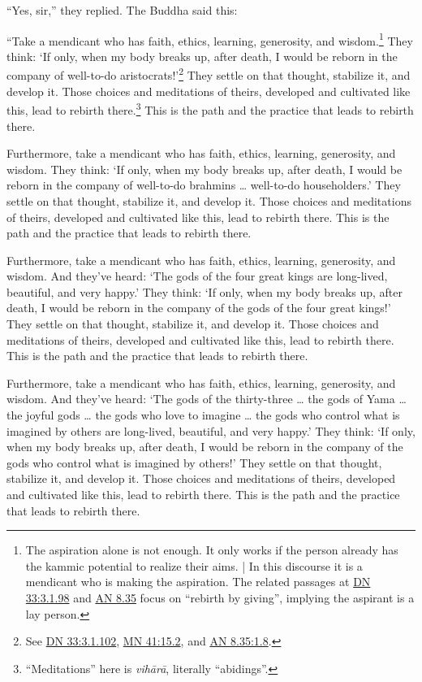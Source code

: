 \documentclass[12pt,openany]{book}%
\begin{document}
“Yes, sir,” they replied. The Buddha said this: 

“Take a mendicant who has faith, ethics, learning, generosity, and wisdom.\footnote{The aspiration alone is not enough. It only works if the person already has the kammic potential to realize their aims. | In this discourse it is a mendicant who is making the aspiration. The related passages at \href{https://suttacentral.net/dn33/en/sujato\#3.1.98}{DN 33:3.1.98} and \href{https://suttacentral.net/an8.35/en/sujato}{AN 8.35} focus on “rebirth by giving”, implying the aspirant is a lay person. } They think: ‘If only, when my body breaks up, after death, I would be reborn in the company of well-to-do aristocrats!’\footnote{See \href{https://suttacentral.net/dn33/en/sujato\#3.1.102}{DN 33:3.1.102}, \href{https://suttacentral.net/mn41/en/sujato\#15.2}{MN 41:15.2}, and \href{https://suttacentral.net/an8.35/en/sujato\#1.8}{AN 8.35:1.8}. } They settle on that thought, stabilize it, and develop it. Those choices and meditations of theirs, developed and cultivated like this, lead to rebirth there.\footnote{“Meditations” here is \textit{\textsanskrit{vihārā}}, literally “abidings”. } This is the path and the practice that leads to rebirth there. 

Furthermore, take a mendicant who has faith, ethics, learning, generosity, and wisdom. They think: ‘If only, when my body breaks up, after death, I would be reborn in the company of well-to-do brahmins … well-to-do householders.’ They settle on that thought, stabilize it, and develop it. Those choices and meditations of theirs, developed and cultivated like this, lead to rebirth there. This is the path and the practice that leads to rebirth there. 

Furthermore, take a mendicant who has faith, ethics, learning, generosity, and wisdom. And they’ve heard: ‘The gods of the four great kings are long-lived, beautiful, and very happy.’ They think: ‘If only, when my body breaks up, after death, I would be reborn in the company of the gods of the four great kings!’ They settle on that thought, stabilize it, and develop it. Those choices and meditations of theirs, developed and cultivated like this, lead to rebirth there. This is the path and the practice that leads to rebirth there. 

Furthermore, take a mendicant who has faith, ethics, learning, generosity, and wisdom. And they’ve heard: ‘The gods of the thirty-three … the gods of Yama … the joyful gods … the gods who love to imagine … the gods who control what is imagined by others are long-lived, beautiful, and very happy.’ They think: ‘If only, when my body breaks up, after death, I would be reborn in the company of the gods who control what is imagined by others!’ They settle on that thought, stabilize it, and develop it. Those choices and meditations of theirs, developed and cultivated like this, lead to rebirth there. This is the path and the practice that leads to rebirth there. 
\end{document}

